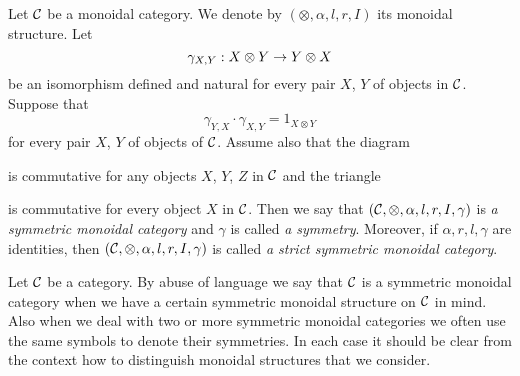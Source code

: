 \begin{definition}
Let ${\mathcal C}$ be a monoidal category. We denote by $(\otimes, \alpha, l, r, I)$ its monoidal structure. Let
$$\gamma_{X,Y}:X\otimes Y\rightarrow Y\otimes X$$
be an isomorphism defined and natural for every pair $X$, $Y$ of objects in ${\mathcal C}$. Suppose that
$$\gamma_{Y,X}\cdot \gamma_{X,Y}= 1_{X\otimes Y}$$
for every pair $X$, $Y$ of objects of ${\mathcal C}$. Assume also that the diagram
\begin{center}
\end{center}
is commutative for any objects $X$, $Y$, $Z$ in ${\mathcal C}$ and the triangle
\begin{center}
\end{center}
is commutative for every object $X$ in ${\mathcal C}$. Then we say that $({\mathcal C},\otimes, \alpha, l, r, I, \gamma)$ is \textit{a symmetric monoidal category} and $\gamma$ is called \textit{a symmetry}. Moreover, if $\alpha, r, l, \gamma$ are identities, then $({\mathcal C},\otimes, \alpha, l, r, I, \gamma)$ is called \textit{a strict symmetric monoidal category}.
\end{definition}
\noindent
Let ${\mathcal C}$ be a category. By abuse of language we say that ${\mathcal C}$ is a symmetric monoidal category when we have a certain symmetric monoidal structure on ${\mathcal C}$ in mind. Also when we deal with two or more symmetric monoidal categories we often use the same symbols to denote their symmetries. In each case it should be clear from the context how to distinguish monoidal structures that we consider.

